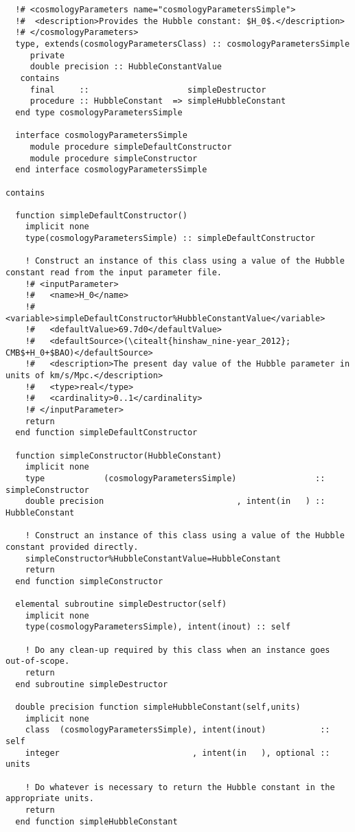 \begin{lstlisting}
  !# <cosmologyParameters name="cosmologyParametersSimple">
  !#  <description>Provides the Hubble constant: $H_0$.</description>
  !# </cosmologyParameters>
  type, extends(cosmologyParametersClass) :: cosmologyParametersSimple
     private
     double precision :: HubbleConstantValue
   contains
     final     ::                    simpleDestructor
     procedure :: HubbleConstant  => simpleHubbleConstant
  end type cosmologyParametersSimple

  interface cosmologyParametersSimple
     module procedure simpleDefaultConstructor
     module procedure simpleConstructor
  end interface cosmologyParametersSimple

contains

  function simpleDefaultConstructor()
    implicit none
    type(cosmologyParametersSimple) :: simpleDefaultConstructor

    ! Construct an instance of this class using a value of the Hubble constant read from the input parameter file.
    !# <inputParameter>
    !#   <name>H_0</name>
    !#   <variable>simpleDefaultConstructor%HubbleConstantValue</variable>
    !#   <defaultValue>69.7d0</defaultValue>
    !#   <defaultSource>(\citealt{hinshaw_nine-year_2012}; CMB$+H_0+$BAO)</defaultSource>
    !#   <description>The present day value of the Hubble parameter in units of km/s/Mpc.</description>
    !#   <type>real</type>
    !#   <cardinality>0..1</cardinality>
    !# </inputParameter>
    return
  end function simpleDefaultConstructor

  function simpleConstructor(HubbleConstant)
    implicit none
    type            (cosmologyParametersSimple)                :: simpleConstructor
    double precision                           , intent(in   ) :: HubbleConstant

    ! Construct an instance of this class using a value of the Hubble constant provided directly.
    simpleConstructor%HubbleConstantValue=HubbleConstant
    return
  end function simpleConstructor

  elemental subroutine simpleDestructor(self)
    implicit none
    type(cosmologyParametersSimple), intent(inout) :: self

    ! Do any clean-up required by this class when an instance goes out-of-scope.
    return
  end subroutine simpleDestructor

  double precision function simpleHubbleConstant(self,units)
    implicit none
    class  (cosmologyParametersSimple), intent(inout)           :: self
    integer                           , intent(in   ), optional :: units

    ! Do whatever is necessary to return the Hubble constant in the appropriate units.
    return
  end function simpleHubbleConstant
\end{lstlisting}

